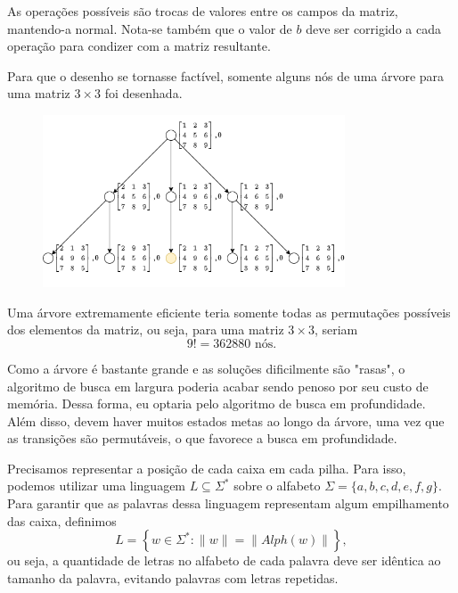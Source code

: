 \documentclass[a4paper]{report}
\begin{document}

As operações possíveis são trocas de valores entre os campos da matriz, mantendo-a normal. Nota-se também que o valor de $b$ deve ser corrigido a cada operação para condizer com a matriz resultante.


Para que o desenho se tornasse factível, somente alguns nós de uma árvore para uma matriz $3\times 3$ foi desenhada.

\begin{figure}[H]
    \centering
    \includegraphics[width=0.8\textwidth]{figures/lista1_5_d.png}
\end{figure}


Uma árvore extremamente eficiente teria somente todas as permutações possíveis dos elementos da matriz, ou seja, para uma matriz $3\times 3$, seriam \[
9! = 362880\text{ nós}
.\] 


Como a árvore é bastante grande e as soluções dificilmente são "rasas", o algoritmo de busca em largura poderia acabar sendo penoso por seu custo de memória. Dessa forma, eu optaria pelo algoritmo de busca em profundidade. Além disso, devem haver muitos estados metas ao longo da árvore, uma vez que as transições são permutáveis, o que favorece a busca em profundidade.



Precisamos representar a posição de cada caixa em cada pilha. Para isso, podemos utilizar uma linguagem $L\subseteq \Sigma^*$ sobre o alfabeto $\Sigma=\{a,b,c,d,e,f,g\} $. Para garantir que as palavras dessa linguagem representam algum empilhamento das caixa, definimos \[
L = \left\{ w\in \Sigma^* : \|w\| = \|Alph\left( w \right) \|\right\} 
,\] ou seja, a quantidade de letras no alfabeto de cada palavra deve ser idêntica ao tamanho da palavra, evitando palavras com letras repetidas.
\end{document}
